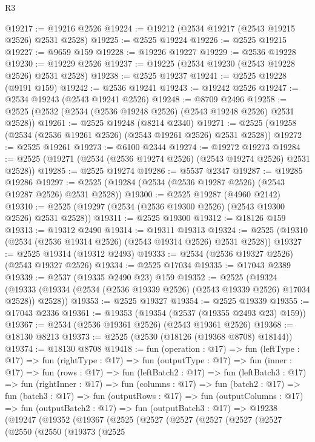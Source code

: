 \begin{lexlean}{R3}
\begin{coremodule}
@19217 := @19216 @2526
@19224 := @19212 (@2534 @19217 (@2543 @19215 @2526) @2531 @2528)
@19225 := @2525 @19224
@19226 := @2525 @19215
@19227 := @9659 @159
@19228 := @19226 @19227
@19229 := @2536 @19228
@19230 := @19229 @2526
@19237 := @19225 (@2534 @19230 (@2543 @19228 @2526) @2531 @2528)
@19238 := @2525 @19237
@19241 := @2525 @19228 (@9191 @159)
@19242 := @2536 @19241
@19243 := @19242 @2526
@19247 := @2534 @19243 (@2543 @19241 @2526)
@19248 := @8709 @2496
@19258 := @2525 (@2532 (@2534 (@2536 @19248 @2526) (@2543 @19248 @2526) @2531 @2528))
@19261 := @2525 @19248 (@8214 @2340)
@19271 := @2525 (@19258 (@2534 (@2536 @19261 @2526) (@2543 @19261 @2526) @2531 @2528))
@19272 := @2525 @19261
@19273 := @6100 @2344
@19274 := @19272 @19273
@19284 := @2525 (@19271 (@2534 (@2536 @19274 @2526) (@2543 @19274 @2526) @2531 @2528))
@19285 := @2525 @19274
@19286 := @5537 @2347
@19287 := @19285 @19286
@19297 := @2525 (@19284 (@2534 (@2536 @19287 @2526) (@2543 @19287 @2526) @2531 @2528))
@19300 := @2525 @19287 (@4960 @2142)
@19310 := @2525 (@19297 (@2534 (@2536 @19300 @2526) (@2543 @19300 @2526) @2531 @2528))
@19311 := @2525 @19300
@19312 := @18126 @159
@19313 := @19312 @2490
@19314 := @19311 @19313
@19324 := @2525 (@19310 (@2534 (@2536 @19314 @2526) (@2543 @19314 @2526) @2531 @2528))
@19327 := @2525 @19314 (@19312 @2493)
@19333 := @2534 (@2536 @19327 @2526) (@2543 @19327 @2526)
@19334 := @2525 @17034
@19335 := @17043 @2389
@19339 := @2537 (@19335 @2490 @23) @159
@19352 := @2525
    (@19324 (@19333 (@19334 (@2534 (@2536 @19339 @2526) (@2543 @19339 @2526) @17034 @2528)) @2528))
@19353 := @2525 @19327
@19354 := @2525 @19339
@19355 := @17043 @2336
@19361 := @19353 (@19354 (@2537 (@19355 @2493 @23) @159))
@19367 := @2534 (@2536 @19361 @2526) (@2543 @19361 @2526)
@19368 := @18130 @8213
@19373 := @2525 (@2530 (@18126 (@19368 @8708) @18144))
@19374 := @18130 @8708
@19418 := fun (operation : @17) =>
  fun (leftType : @17) =>
  fun (rightType : @17) =>
  fun (outputType : @17) =>
  fun (inner : @17) =>
  fun (rows : @17) =>
  fun (leftBatch2 : @17) =>
  fun (leftBatch3 : @17) =>
  fun (rightInner : @17) =>
  fun (columns : @17) =>
  fun (batch2 : @17) =>
  fun (batch3 : @17) =>
  fun (outputRows : @17) =>
  fun (outputColumns : @17) =>
  fun (outputBatch2 : @17) =>
  fun (outputBatch3 : @17) =>
  @19238
    (@19247
      (@19352
        (@19367
          (@2525
            (@2527
              (@2527
                (@2527
                  (@2527
                    (@2527
                      (@2550
                        (@2550
                          (@19373
                            (@2525

\end{coremodule}
\end{lexlean}
